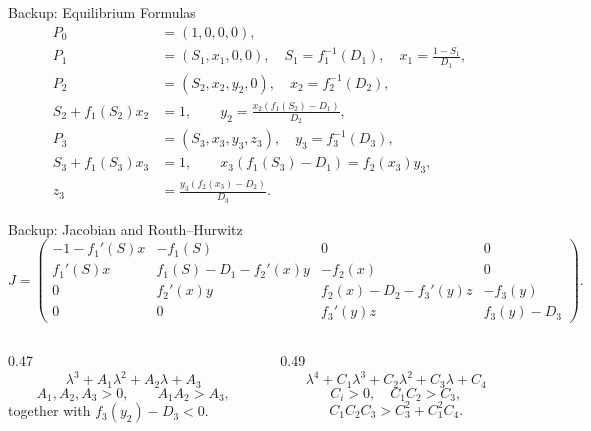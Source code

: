 \begin{frame}[t]{Backup: Equilibrium Formulas}
  \fontsize{10}{12}\selectfont
  \begin{align*}
    P_0 &= (1,0,0,0),\\
    P_1 &= (S_1,x_1,0,0),\quad
    S_1=f_1^{-1}(D_1),\quad
    x_1=\frac{1-S_1}{D_1},\\
    P_2 &= (S_2,x_2,y_2,0),\quad
    x_2=f_2^{-1}(D_2),\\
    S_2+f_1(S_2)x_2&=1,\qquad
    y_2=\frac{x_2(f_1(S_2)-D_1)}{D_2},\\
    P_3 &= (S_3,x_3,y_3,z_3),\quad
    y_3=f_3^{-1}(D_3),\\
    S_3+f_1(S_3)x_3&=1,\qquad
    x_3(f_1(S_3)-D_1)=f_2(x_3)y_3,\\
    z_3&=\frac{y_3(f_2(x_3)-D_2)}{D_3}.
  \end{align*}
\end{frame}

\begin{frame}[t]{Backup: Jacobian and Routh--Hurwitz}
  \small
  \[
  J=\begin{pmatrix}
  -1-f_1'(S)x & -f_1(S) & 0 & 0\\
  f_1'(S)x & f_1(S)-D_1-f_2'(x)y & -f_2(x) & 0\\
  0 & f_2'(x)y & f_2(x)-D_2-f_3'(y)z & -f_3(y)\\
  0 & 0 & f_3'(y)z & f_3(y)-D_3
  \end{pmatrix}.
  \]

  \begin{columns}[T,onlytextwidth]
    \begin{column}{0.47\textwidth}
      \[
        \lambda^3+A_1\lambda^2+A_2\lambda+A_3
      \]
      \[
        A_1,A_2,A_3>0,\qquad A_1A_2>A_3,
      \]
      together with $f_3(y_2)-D_3<0$.
    \end{column}
    \begin{column}{0.49\textwidth}
      \[
        \lambda^4+C_1\lambda^3+C_2\lambda^2+C_3\lambda+C_4
      \]
      \[
        C_i>0,\quad C_1C_2>C_3,
      \]
      \[
        C_1C_2C_3>C_3^2+C_1^2C_4.
      \]
    \end{column}
  \end{columns}
\end{frame}

